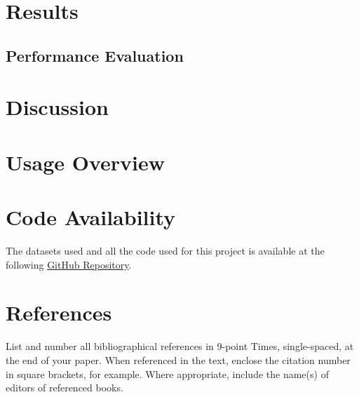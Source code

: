 \documentclass[10pt,twocolumn,letterpaper]{article}
\begin{document}
\section{Results}

\subsection{Performance Evaluation}

\section{Discussion}

\section{Usage Overview}

\section{Code Availability}
The datasets used and all the code used for this project is available
at the following \href{https://github.com/marcouderzo/BioData-ProteinFunctionPrediction}{GitHub Repository}.



\section{References}

List and number all bibliographical references in 9-point Times,
single-spaced, at the end of your paper. When referenced in the text,
enclose the citation number in square brackets, for
example.  Where appropriate, include the name(s) of
editors of referenced books.

%
%
\end{document}
